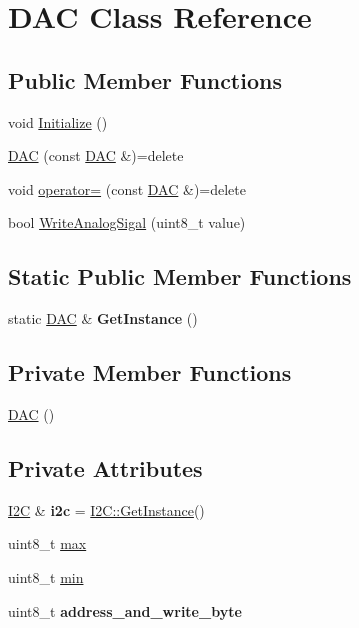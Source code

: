 \hypertarget{class_d_a_c}{}\section{D\+AC Class Reference}
\label{class_d_a_c}
\subsection*{Public Member Functions}
\begin{DoxyCompactItemize}
\item 
void \hyperlink{class_d_a_c_a834456c539ee1936f7da8e4bfaa407f0}{Initialize} ()
\item 
\hyperlink{class_d_a_c_af656669246f70c7ccbbd05d0e65088d4}{D\+AC} (const \hyperlink{class_d_a_c}{D\+AC} \&)=delete
\item 
void \hyperlink{class_d_a_c_a9e16a3d53b57588cba0ff2f9ade78e6b}{operator=} (const \hyperlink{class_d_a_c}{D\+AC} \&)=delete
\item 
bool \hyperlink{class_d_a_c_ae7d843a3795822e893fb2b2d996b0666}{Write\+Analog\+Sigal} (uint8\+\_\+t value)
\end{DoxyCompactItemize}
\subsection*{Static Public Member Functions}
\begin{DoxyCompactItemize}
\item 
\hypertarget{class_d_a_c_aa97df751677eb0db87b3e3a5a1cb6049}{}\label{class_d_a_c_aa97df751677eb0db87b3e3a5a1cb6049} 
static \hyperlink{class_d_a_c}{D\+AC} \& {\bfseries Get\+Instance} ()
\end{DoxyCompactItemize}
\subsection*{Private Member Functions}
\begin{DoxyCompactItemize}
\item 
\hyperlink{class_d_a_c_a9908e07a5c096380eeb4c4061d58476d}{D\+AC} ()
\end{DoxyCompactItemize}
\subsection*{Private Attributes}
\begin{DoxyCompactItemize}
\item 
\hypertarget{class_d_a_c_a6517e861453f7b7f6108c7a6ed2825ac}{}\label{class_d_a_c_a6517e861453f7b7f6108c7a6ed2825ac} 
\hyperlink{class_i2_c}{I2C} \& {\bfseries i2c} = \hyperlink{class_i2_c_ade3b5d971432c82867201123965cf3fd}{I2\+C\+::\+Get\+Instance}()
\item 
uint8\+\_\+t \hyperlink{class_d_a_c_a229a81d8ebf43511dfb6815c5cd8f425}{max}
\item 
uint8\+\_\+t \hyperlink{class_d_a_c_aa4f21cf166374cfc6edcd412f4d2072b}{min}
\item 
\hypertarget{class_d_a_c_a1dd1e9c4a63f493da44d7208e59cc83e}{}\label{class_d_a_c_a1dd1e9c4a63f493da44d7208e59cc83e} 
uint8\+\_\+t {\bfseries address\+\_\+and\+\_\+write\+\_\+byte}
\end{DoxyCompactItemize}


